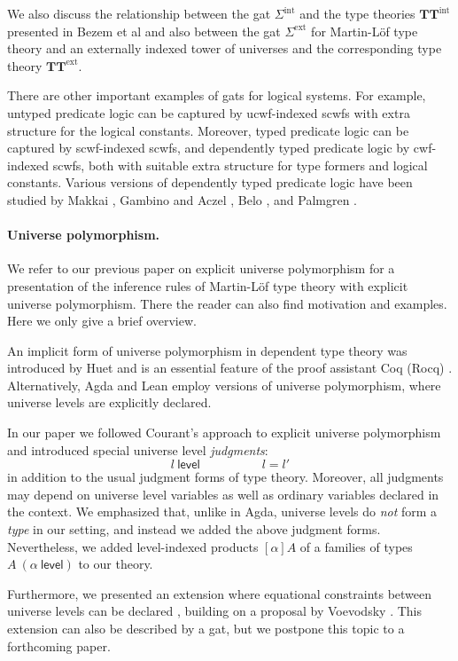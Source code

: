 \documentclass[11pt,a4paper]{article}
\theoremstyle{definition}
\newcommand{\level}{\mathsf{level}}
\def\Sigmaext{\Sigma^\mathrm{ext}}
\def\Sigmaint{\Sigma^\mathrm{int}}
\def\TText{\mathbf{TT}^\mathrm{ext}}
\def\TTint{\mathbf{TT}^\mathrm{int}}
\begin{document}
We also discuss the relationship between the gat $\Sigmaint$ and the type theories $\TTint$ presented in Bezem et al  \cite{BezemCDE22} and also between the gat $\Sigmaext$ for Martin-Löf type theory and an externally indexed tower of universes and the corresponding type theory $\TText$.

There are other important examples of gats for logical systems. For example, untyped predicate logic can be captured by ucwf-indexed scwfs with extra structure for the logical constants. Moreover, typed predicate logic can be captured by scwf-indexed scwfs, and dependently typed predicate logic by cwf-indexed scwfs, both with suitable extra structure for type formers and logical constants. Various versions of dependently typed predicate logic have been studied by Makkai \cite{makkai:folds}, Gambino and Aczel \cite{gambino-aczel}, Belo \cite{belo}, and Palmgren \cite{Palmgren19}.

\paragraph{Universe polymorphism.} We refer to our previous paper on explicit universe polymorphism \cite{BezemCDE22} for a presentation of the inference rules of Martin-Löf type theory with explicit universe polymorphism. There the reader can also find motivation and examples. Here we only give a brief overview. 

An implicit form of universe polymorphism in dependent type theory was introduced by Huet \cite{Huet87} and is an essential feature of the proof assistant Coq (Rocq) \cite{coq:general}. Alternatively, Agda \cite{agda-wiki} and Lean \cite{moura:lean} employ versions of universe polymorphism, where universe levels are explicitly declared. 

In our paper we followed Courant's approach \cite{Courant02} to explicit universe polymorphism and introduced special universe level {\em judgments}:
$$
l\ \level
\hspace{5em}
l = l'
$$
in addition to the usual judgment forms of type theory. Moreover, all judgments may depend on universe level variables as well as ordinary variables declared in the context. We emphasized that, unlike in Agda, universe levels do {\em not} form a {\em type} in our setting, and instead we added the above judgment forms. Nevertheless, we added level-indexed products $[\alpha]A$ of a families of types $A\ (\alpha\ \level)$ to our theory.

Furthermore, we presented an extension where equational constraints between universe levels can be declared \cite{BezemCDE22}, building on a proposal by Voevodsky \cite{VV}. This extension can also be described by a gat, but we postpone this topic to a forthcoming paper.
\end{document}
